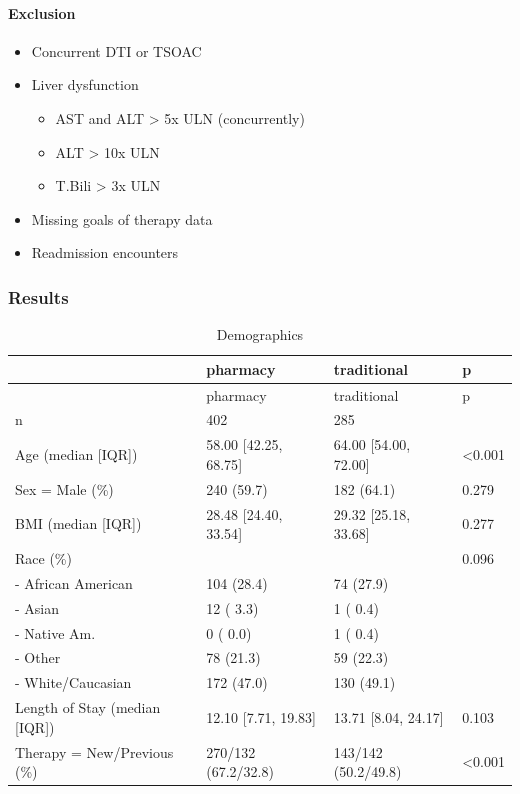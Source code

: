 \documentclass[]{article}
\providecommand{\tightlist}{%
  \setlength{\itemsep}{0pt}\setlength{\parskip}{0pt}}
\let\oldparagraph\paragraph
\renewcommand{\paragraph}[1]{\oldparagraph{#1}\mbox{}}
\begin{document}
\paragraph{Exclusion}\label{exclusion}

\begin{itemize}
\tightlist
\item
  Concurrent DTI or TSOAC
\item
  Liver dysfunction

  \begin{itemize}
  \tightlist
  \item
    AST and ALT \textgreater{} 5x ULN (concurrently)
  \item
    ALT \textgreater{} 10x ULN
  \item
    T.Bili \textgreater{} 3x ULN
  \end{itemize}
\item
  Missing goals of therapy data
\item
  Readmission encounters
\end{itemize}

\subsubsection{Results}\label{results}

\begin{longtable}[]{@{}llll@{}}
\caption{Demographics}\tabularnewline
\toprule
& pharmacy & traditional & p\tabularnewline
\midrule
\endfirsthead
\toprule
& pharmacy & traditional & p\tabularnewline
\midrule
\endhead
n & 402 & 285 &\tabularnewline
Age (median {[}IQR{]}) & 58.00 {[}42.25, 68.75{]} & 64.00 {[}54.00,
72.00{]} & \textless{}0.001\tabularnewline
Sex = Male (\%) & 240 (59.7) & 182 (64.1) & 0.279\tabularnewline
BMI (median {[}IQR{]}) & 28.48 {[}24.40, 33.54{]} & 29.32 {[}25.18,
33.68{]} & 0.277\tabularnewline
Race (\%) & & & 0.096\tabularnewline
- African American & 104 (28.4) & 74 (27.9) &\tabularnewline
- Asian & 12 ( 3.3) & 1 ( 0.4) &\tabularnewline
- Native Am. & 0 ( 0.0) & 1 ( 0.4) &\tabularnewline
- Other & 78 (21.3) & 59 (22.3) &\tabularnewline
- White/Caucasian & 172 (47.0) & 130 (49.1) &\tabularnewline
Length of Stay (median {[}IQR{]}) & 12.10 {[}7.71, 19.83{]} & 13.71
{[}8.04, 24.17{]} & 0.103\tabularnewline
Therapy = New/Previous (\%) & 270/132 (67.2/32.8) & 143/142 (50.2/49.8)
& \textless{}0.001\tabularnewline
\bottomrule
\end{longtable}
\end{document}
